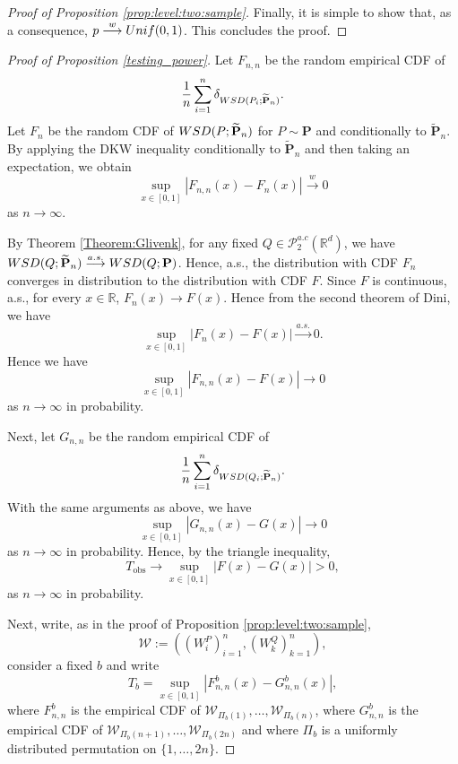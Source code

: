 \documentclass{imsart}
\numberwithin{equation}{section}
\def\R{\mathbb{R}}
\begin{document}
\begin{proof}[Proof of Proposition \ref{prop:level:two:sample}]
	Finally, it is simple to show that, as a consequence, $p \stackrel{w}{\longrightarrow} \rm{Unif}(0, 1)$. This concludes the proof.
\end{proof}

\begin{proof}[Proof of Proposition \ref{testing_power}]
	
	Let $F_{n,n}$ be the random empirical CDF of
	\[
	\frac{1}{n}
	\sum_{i=1}^n
	\delta_{ \rm{WSD}(P_{i}; \widetilde{\mathbf{P}}_{n}) }.
	\]
	Let $F_n$ be the random CDF of $\rm{WSD}(P; \widetilde{\mathbf{P}}_{n})$ for $P \sim \mathbf{P}$ and conditionally to $\widetilde{\mathbf{P}}_{n}$. By applying the DKW inequality conditionally to $\widetilde{\mathbf{P}}_{n}$ and then taking an expectation, we obtain
	\[
	\sup_{x \in [0,1]}
	\left| 
	F_{n,n}(x)
	-
	F_n(x)
	\right| 
	\stackrel{w}{\longrightarrow} 
	0
	\]
	as $n \to \infty$. 
	
	By Theorem \ref{Theorem:Glivenk}, for any fixed $Q \in \mathcal{P}_2^{a.c}(\R^d)$, we have $\rm{WSD}(Q; \widetilde{\mathbf{P}}_{n})
	\stackrel{a.s.}{\longrightarrow} 
	\rm{WSD}(Q; \mathbf{P})
	$. Hence, a.s., the distribution with CDF $F_n$ converges in distribution to the distribution with CDF $F$. Since $F$ is continuous, a.s., for every $x \in \mathbb{R}$,
	$F_n(x) \to F(x)$. Hence from the second theorem of Dini, we have
	\[
	\sup_{x \in [0,1]}
	\left| 
	F_{n}(x)
	-
	F(x)
	\right| 
	\stackrel{a.s.}{\longrightarrow} 
	0.
	\]
	Hence we have 
	\[
	\sup_{x \in [0,1]}
	\left| 
	F_{n,n}(x)
	-
	F(x)
	\right| 
	\stackrel{}{\longrightarrow} 
	0
	\]
	as $n \to \infty$ in probability. 
	
	Next, let $G_{n,n}$ be the random empirical CDF of
	\[
	\frac{1}{n}
	\sum_{i=1}^n
	\delta_{ \rm{WSD}(Q_{i}; \widetilde{\mathbf{P}}_{n}) }.
	\]
	With the same arguments as above, we have
	\[
	\sup_{x \in [0,1]}
	\left| 
	G_{n,n}(x)
	-
	G(x)
	\right| 
	\stackrel{}{\longrightarrow} 
	0
	\]
	as $n \to \infty$ in probability.
	Hence, by the triangle inequality,
	\[
	T_{\text{obs}}
	\stackrel{}{\longrightarrow} 
	\sup_{x \in [0,1]}
	\left| 
	F(x)
	-
	G(x)
	\right| 
	>0,
	\]
	as $n \to \infty$ in probability. 
	
	Next, write, as in the proof of Proposition \ref{prop:level:two:sample},
	\[
	\mathcal{W} := (( W^P_i)_{i=1}^n ,  ( W^Q_k )_{k=1}^n),
	\]
	consider a fixed $b$
	and write
	\[
	T_b = 
	\sup_{x \in [0,1]}
	\left| 
	F^b_{n,n}(x)
	-
	G^b_{n,n}(x)
	\right|, 
	\]
	where $F^b_{n,n}$ is the empirical CDF of 
	$
	\mathcal{W}_{\Pi_b(1)},
	\dots,
	\mathcal{W}_{\Pi_b(n)}
	$, where
	$G^b_{n,n}$ is the empirical CDF of 
	$
	\mathcal{W}_{\Pi_b(n+1)},
	\dots,
	\mathcal{W}_{\Pi_b(2n)}
	$
	and where $\Pi_b$ is a uniformly distributed permutation on $\{1 , \dots,2n\}$.
	

\end{proof}
\end{document}
